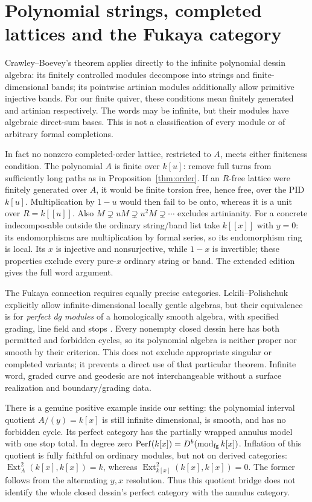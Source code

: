 \section{Polynomial strings, completed lattices and the Fukaya category}
Crawley--Boevey's theorem \cite[Theorems1.1--1.4]{CrawleyBoeveyStrings} applies directly to the infinite polynomial dessin algebra: its finitely controlled modules decompose into strings and finite-dimensional bands; its pointwise artinian modules additionally allow primitive injective bands. For our finite quiver, these conditions mean finitely generated and artinian respectively. The words may be infinite, but their modules have algebraic direct-sum bases. This is not a classification of every module or of arbitrary formal completions.

In fact no nonzero completed-order lattice, restricted to $A$, meets either finiteness condition. The polynomial $A$ is finite over $k[u]$: remove full turns from sufficiently long paths as in Proposition~\ref{thm:order}. If an $R$-free lattice were finitely generated over $A$, it would be finite torsion free, hence free, over the PID $k[u]$. Multiplication by $1-u$ would then fail to be onto, whereas it is a unit over $R=k[[u]]$. Also $M\supsetneq uM\supsetneq u^2M\supsetneq\cdots$ excludes artinianity. For a concrete indecomposable outside the ordinary string/band list take $k[[x]]$ with $y=0$: its endomorphisms are multiplication by formal series, so its endomorphism ring is local. Its $x$ is injective and nonsurjective, while $1-x$ is invertible; these properties exclude every pure-$x$ ordinary string or band. The extended edition gives the full word argument.

The Fukaya connection requires equally precise categories. Lekili--Polishchuk explicitly allow infinite-dimensional locally gentle algebras, but their equivalence is for \emph{perfect dg modules} of a homologically smooth algebra, with specified grading, line field and stops \cite[Definition3.1.1, Lemma3.1.3, Theorem3.2.2]{LekiliPolishchuk}. Every nonempty closed dessin here has both permitted and forbidden cycles, so its polynomial algebra is neither proper nor smooth by their criterion. This does not exclude appropriate singular or completed variants; it prevents a direct use of that particular theorem. Infinite word, graded curve and geodesic are not interchangeable without a surface realization and boundary/grading data.

There is a genuine positive example inside our setting: the polynomial interval quotient $A/(y)=k[x]$ is still infinite dimensional, is smooth, and has no forbidden cycle. Its perfect category has the partially wrapped annulus model with one stop total. In degree zero $\operatorname{Perf}(k[x])=D^b(\operatorname{mod}_{\rm fg}k[x])$. Inflation of this quotient is fully faithful on ordinary modules, but not on derived categories: $\operatorname{Ext}_A^2(k[x],k[x])=k$, whereas $\operatorname{Ext}_{k[x]}^2(k[x],k[x])=0$. The former follows from the alternating $y,x$ resolution. Thus this quotient bridge does not identify the whole closed dessin's perfect category with the annulus category.

